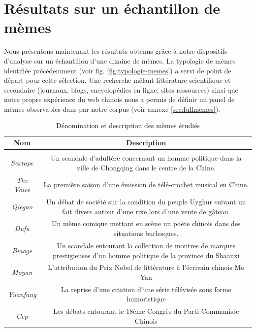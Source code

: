 \section{Résultats sur un échantillon de mèmes}
\label{sec:results-memes}

Nous présentons maintenant les résultats obtenus grâce à notre dispositifs d'analyse sur un échantillon d'une dizaine de mèmes. La typologie de mèmes identifiée précédemment (voir fig. \ref{fig:typologie-memes}) a servi de point de départ pour cette sélection. Une recherche mêlant littérature scientifique et secondaire (journaux, blogs, encyclopédies en ligne, sites ressources) ainsi que notre propre expérience du web chinois nous a permis de définir un panel de mèmes observables dans par notre corpus (voir annexe \ref{sec:fullmemes}). 

\begin{table}[htbp]
  \begin{tabulary}{\textwidth}{c|C}

    \textbf{Nom} &
    \textbf{Description}\\
    \hline \\[-1.5ex]
    \textit{Sextape} &
    Un scandale d{\textquoteright}adultère concernant un homme politique
    dans la ville de Chongqing dans le centre de la Chine.\\[2ex]

    \textit{The Voice} &
    La première saison d{\textquoteright}une émission de
    télé-crochet musical en Chine.\\[2ex]

    \textit{Qiegao} &
    Un débat de société sur la condition du peuple Uyghur suivant un
    fait divers autour d{\textquoteright}une rixe lors
    d{\textquoteright}une vente de gâteau.\\[2ex]

    \textit{Dufu} &
    Un mème comique mettant en scène un poète chinois dans des
    situations burlesques.\\[2ex]

    \textit{Biaoge} &
    Un scandale entourant la collection de montres de marques prestigieuses
    d{\textquoteright}un homme politique de la province du Shaanxi \\[2ex]

    \textit{Moyan} &
    L{\textquoteright}attribution du Prix Nobel de littérature \`a
    l{\textquoteright}écrivain chinois Mo Yan\\[2ex]

    \textit{Yuanfang} &
    La reprise d{\textquoteright}une citation d{\textquoteright}une série
    télévisée sous forme humoristique\\[2ex]

    \textit{Ccp} &
    Les débats entourant le 18ème Congrès du Parti Communiste Chinois\\[2ex]

  \end{tabulary}
  \caption{Dénomination et description des mèmes étudiés}
  \label{fig:meme-sample}
\end{table}


